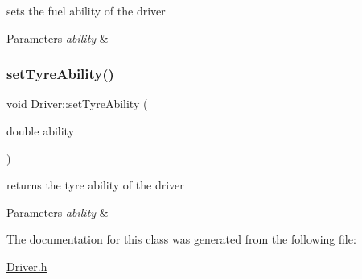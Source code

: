 sets the fuel ability of the driver 
\begin{DoxyParams}{Parameters}
{\em ability} & \\
\hline
\end{DoxyParams}
\mbox{\label{class_driver_a52a0784b8b88c417271e99b4b2f8bf37}} 
\subsubsection{\texorpdfstring{set\+Tyre\+Ability()}{setTyreAbility()}}
{\footnotesize\ttfamily void Driver\+::set\+Tyre\+Ability (\begin{DoxyParamCaption}\item[{double}]{ability }\end{DoxyParamCaption})\hspace{0.3cm}{\ttfamily [inline]}}

returns the tyre ability of the driver 
\begin{DoxyParams}{Parameters}
{\em ability} & \\
\hline
\end{DoxyParams}


The documentation for this class was generated from the following file\+:\begin{DoxyCompactItemize}
\item 
\mbox{\hyperlink{_driver_8h}{Driver.\+h}}\end{DoxyCompactItemize}
